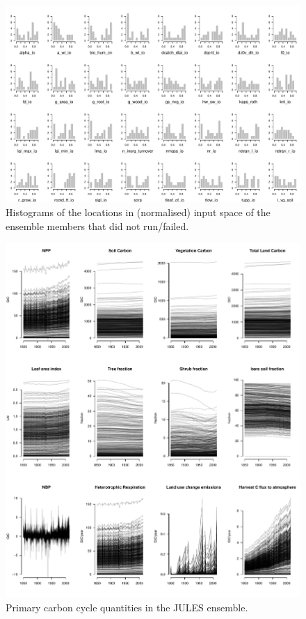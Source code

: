 \documentclass[gmd, manuscript]{copernicus}
\begin{document}
\begin{figure}[t]
\includegraphics[width=12cm]{./graphics/run-failure-hists.pdf}
\caption{Histograms of the locations in (normalised) input space of the ensemble members that did not run/failed.}
\end{figure}



%
\begin{figure}[t]
\includegraphics[width=12cm]{./graphics/plot-carbon-cycle-timeseries-primary-1.pdf}
\caption{Primary carbon cycle quantities in the JULES ensemble.}
\end{figure}
\end{document}
